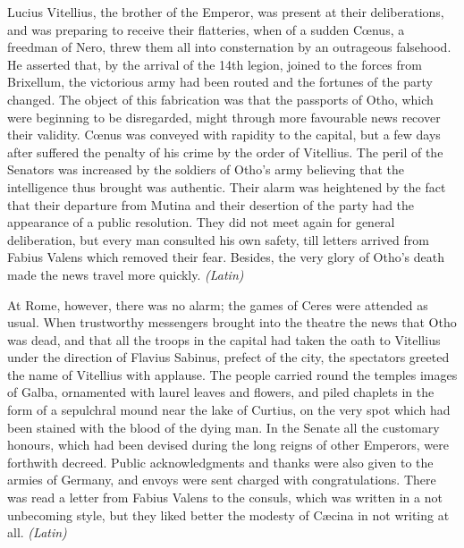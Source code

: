 
Lucius Vitellius, the brother of the Emperor, was present at their deliberations, and was preparing to receive their flatteries, when of a sudden Cœnus, a freedman of Nero, threw them all into consternation by an outrageous falsehood. He asserted that, by the arrival of the 14th legion, joined to the forces from Brixellum, the victorious army had been routed and the fortunes of the party changed. The object of this fabrication was that the passports of Otho, which were beginning to be disregarded, might through more favourable news recover their validity. Cœnus was conveyed with rapidity to the capital, but a few days after suffered the penalty of his crime by the order of Vitellius. The peril of the Senators was increased by the soldiers of Otho's army believing that the intelligence thus brought was authentic. Their alarm was heightened by the fact that their departure from Mutina and their desertion of the party had the appearance of a public resolution. They did not meet again for general deliberation, but every man consulted his own safety, till letters arrived from Fabius Valens which removed their fear. Besides, the very glory of Otho's death made the news travel more quickly. \emph{(Latin)}


At Rome, however, there was no alarm; the games of Ceres were attended as usual. When trustworthy messengers brought into the theatre the news that Otho was dead, and that all the troops in the capital had taken the oath to Vitellius under the direction of Flavius Sabinus, prefect of the city, the spectators greeted the name of Vitellius with applause. The people carried round the temples images of Galba, ornamented with laurel leaves and flowers, and piled chaplets in the form of a sepulchral mound near the lake of Curtius, on the very spot which had been stained with the blood of the dying man. In the Senate all the customary honours, which had been devised during the long reigns of other Emperors, were forthwith decreed. Public acknowledgments and thanks were also given to the armies of Germany, and envoys were sent charged with congratulations. There was read a letter from Fabius Valens to the consuls, which was written in a not unbecoming style, but they liked better the modesty of Cæcina in not writing at all. \emph{(Latin)}


